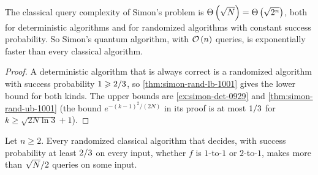 \begin{corollary}\label{thm:simon-det-lb-1001}
    The classical query complexity of Simon's problem is $\Theta\left(\sqrt{N}\right) = \Theta\left(\sqrt{2^n}\right)$, both
    for deterministic algorithms and for randomized algorithms with constant success probability.
    So Simon's quantum algorithm, with $\mathcal{O}\left(n\right)$ queries, is exponentially faster than every
    classical algorithm.
\end{corollary}

\begin{proof}
    A deterministic algorithm that is always correct is a randomized algorithm with success
    probability $1 \geqslant 2/3$, so \cref{thm:simon-rand-lb-1001} gives the lower bound for both
    kinds. The upper bounds are \cref{ex:simon-det-0929} and \cref{thm:simon-rand-ub-1001} (the
    bound $e^{-(k-1)^2/(2N)}$ in its proof is at most $1/3$ for $k \geq \sqrt{2N \ln 3} + 1$).
\end{proof}

\begin{corollary}\label{cor:simon-decision-1001}
    Let $n \geq 2$. Every randomized classical algorithm that decides, with success probability at
    least $2/3$ on every input, whether $f$ is $1$-to-$1$ or $2$-to-$1$, makes more than
    $\sqrt{N}/2$ queries on some input.
\end{corollary}

